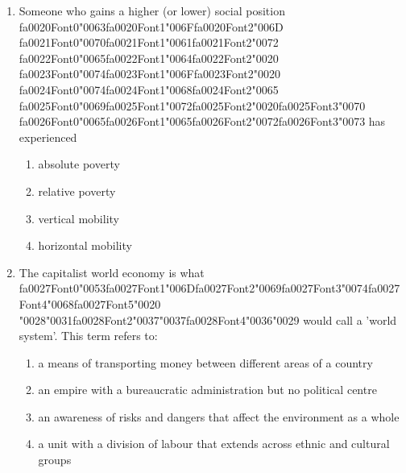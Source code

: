 \documentclass[12pt]{article}
\begin{document}
\begin{enumerate}[label=\arabic*.]
\begin{enumerate}[label=(\alph*)]
\end{enumerate}
\item Someone who gains a higher (or lower) social position {\csname fa0020Font0\endcsname\char"0063}{\csname fa0020Font1\endcsname\char"006F}{\csname fa0020Font2\endcsname\char"006D} {\csname fa0021Font0\endcsname\char"0070}{\csname fa0021Font1\endcsname\char"0061}{\csname fa0021Font2\endcsname\char"0072} {\csname fa0022Font0\endcsname\char"0065}{\csname fa0022Font1\endcsname\char"0064}{\csname fa0022Font2\endcsname\char"0020} {\csname fa0023Font0\endcsname\char"0074}{\csname fa0023Font1\endcsname\char"006F}{\csname fa0023Font2\endcsname\char"0020} {\csname fa0024Font0\endcsname\char"0074}{\csname fa0024Font1\endcsname\char"0068}{\csname fa0024Font2\endcsname\char"0065} {\csname fa0025Font0\endcsname\char"0069}{\csname fa0025Font1\endcsname\char"0072}{\csname fa0025Font2\endcsname\char"0020}{\csname fa0025Font3\endcsname\char"0070} {\csname fa0026Font0\endcsname\char"0065}{\csname fa0026Font1\endcsname\char"0065}{\csname fa0026Font2\endcsname\char"0072}{\csname fa0026Font3\endcsname\char"0073} has experienced
\begin{enumerate}[label=(\alph*)]
    \item absolute poverty
    \item relative poverty
    \item vertical mobility
    \item horizontal mobility
\end{enumerate}
\item The capitalist world economy is what {\csname fa0027Font0\endcsname\char"0053}{\csname fa0027Font1\endcsname\char"006D}{\csname fa0027Font2\endcsname\char"0069}{\csname fa0027Font3\endcsname\char"0074}{\csname fa0027Font4\endcsname\char"0068}{\csname fa0027Font5\endcsname\char"0020} {\char"0028}{\char"0031}{\csname fa0028Font2\endcsname\char"0037}{\char"0037}{\csname fa0028Font4\endcsname\char"0036}{\char"0029} would call a 'world system'. This term refers to:
\begin{enumerate}[label=(\alph*)]
    \item a means of transporting money between different areas of a country
    \item an empire with a bureaucratic administration but no political centre
    \item an awareness of risks and dangers that affect the environment as a whole
    \item a unit with a division of labour that extends across ethnic and cultural groups
\end{enumerate}

\end{enumerate}
\end{document}
